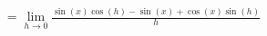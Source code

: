 \documentclass[preview]{standalone}
\begin{document}
\begin{align*}
= \lim_{h \to 0} \frac{\sin(x)\cos(h) - \sin(x) + \cos(x)\sin(h)}{h}
\end{align*}
\end{document}

